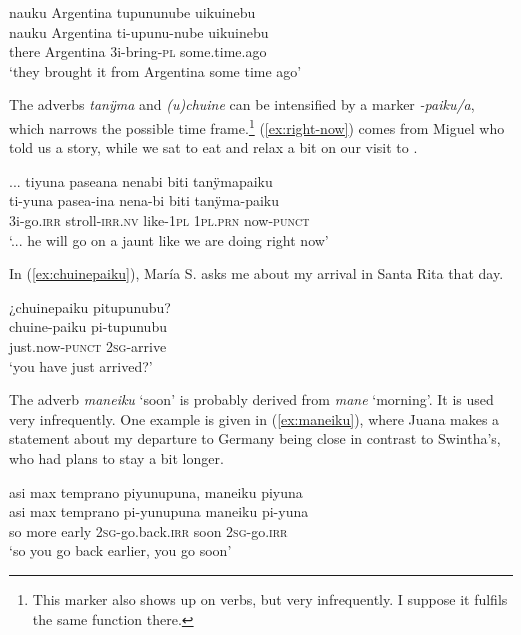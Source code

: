 \ea\label{ex:ukuinebu}
\begingl
\glpreamble nauku Argentina tupununube uikuinebu\\
\gla nauku Argentina ti-upunu-nube uikuinebu\\
\glb there Argentina 3i-bring-\textsc{pl} some.time.ago\\
\glft ‘they brought it  from Argentina some time ago’
\endgl
\trailingcitation{[jxx-e120430l-4.28]}
\xe


The adverbs \textit{tanÿma} and \textit{(u)chuine} can be intensified by a marker \textit{-paiku/a}, which narrows the possible time frame.\footnote{This marker also shows up on verbs, but very infrequently. I suppose it fulfils the same function there.} (\ref{ex:right-now}) comes from Miguel who told us a story, while we sat to eat and relax a bit on our visit to .

\ea\label{ex:right-now}
\begingl
\glpreamble ... tiyuna paseana nenabi biti tanÿmapaiku\\
\gla ti-yuna pasea-ina nena-bi biti tanÿma-paiku\\
\glb 3i-go.\textsc{irr} stroll-\textsc{irr.nv} like-1\textsc{pl} 1\textsc{pl.prn} now-\textsc{punct}\\
\glft ‘... he will go on a jaunt like we are doing right now’
\endgl
{}
\xe



In (\ref{ex:chuinepaiku}), María S. asks me about my arrival in Santa Rita that day.

\ea\label{ex:chuinepaiku}
\begingl
\glpreamble ¿chuinepaiku pitupunubu?\\
\gla chuine-paiku pi-tupunubu\\
\glb just.now-\textsc{punct} 2\textsc{sg}-arrive\\
\glft ‘you have just arrived?’
\endgl
\trailingcitation{[rxx-e120511l.005]}
\xe

The adverb \textit{maneiku} ‘soon’ is probably derived from \textit{mane} ‘morning’. It is used very infrequently. One example is given in (\ref{ex:maneiku}), where Juana makes a statement about my departure to Germany being close in contrast to Swintha’s, who had plans to stay a bit longer.

\ea\label{ex:maneiku}
\begingl
\glpreamble asi max temprano piyunupuna, maneiku piyuna\\
\gla asi max temprano pi-yunupuna maneiku pi-yuna\\
\glb so more early 2\textsc{sg}-go.back.\textsc{irr} soon 2\textsc{sg}-go.\textsc{irr}\\
\glft ‘so you go back earlier, you go soon’
\endgl
\trailingcitation{[jxx-p120430l-2.635]}
\xe


